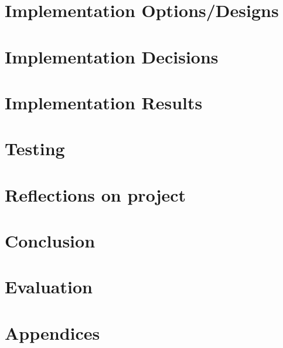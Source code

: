 \documentclass[12pt]{article}
\begin{document}
\section{Implementation Options/Designs}

\newpage

\section{Implementation Decisions}

\newpage


\section{Implementation Results}

\newpage

\section{Testing}

\newpage


\section{Reflections on project}




\section{Conclusion}

\newpage

\section{Evaluation}

\newpage



\section{Appendices}


\newpage
\end{document}
